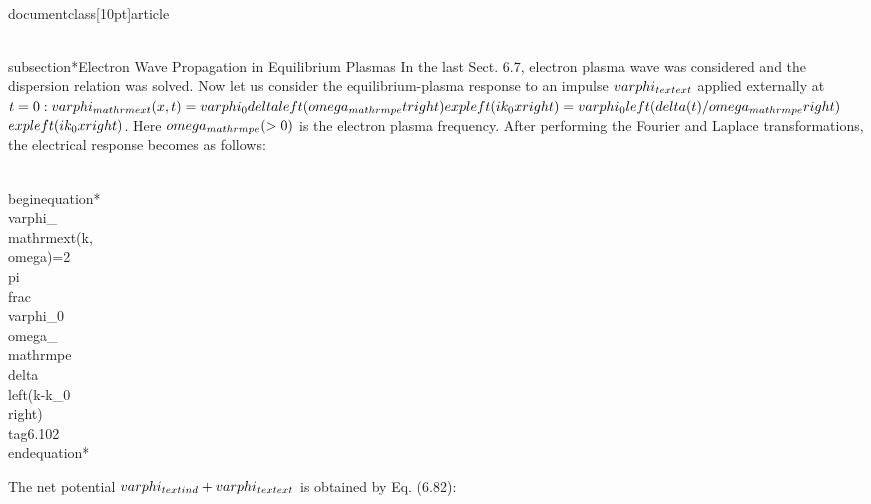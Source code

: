 \\documentclass[10pt]{article}
\begin{document}
{{{{\\subsection*{Electron Wave Propagation in Equilibrium Plasmas}
In the last Sect. 6.7, electron plasma wave was considered and the dispersion relation was solved. Now let us consider the equilibrium-plasma response to an impulse $\\varphi_{\\text {ext }}$ applied externally at $t=0: \\varphi_{\\mathrm{ext}}(x, t)=\\varphi_{0} \\delta\\left(\\omega_{\\mathrm{pe}} t\\right) \\exp \\left(i k_{0} x\\right)=\\varphi_{0}\\left(\\delta(t) / \\omega_{\\mathrm{pe}}\\right)$
$\\exp \\left(i k_{0} x\\right)$. Here $\\omega_{\\mathrm{pe}}(>0)$ is the electron plasma frequency. After performing the Fourier and Laplace transformations, the electrical response becomes as follows:


\\begin{equation*}
\\varphi_{\\mathrm{ext}}(k, \\omega)=2 \\pi \\frac{\\varphi_{0}}{\\omega_{\\mathrm{pe}}} \\delta\\left(k-k_{0}\\right) \\tag{6.102}
\\end{equation*}


The net potential $\\varphi_{\\text {ind }}+\\varphi_{\\text {ext }}$ is obtained by Eq. (6.82):


}}}}
\end{document}
